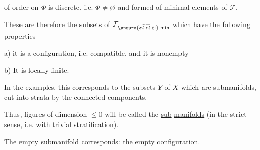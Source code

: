 
of order on $\Phi$ is discrete, i.e. $\Phi\neq\varnothing$ and formed of minimal elements of $\mathcal{F}$.

These are therefore the  subsets of $\mathcal{F}_{\unsure{e\bar l|\overline{el}|\text{él}}\,\mathrm{min}}$ which have the following properties

a) it is a configuration, i.e.    compatible, and it is nonempty

b) It is locally finite.

In the  examples, this corresponds to the  subsets $Y$ of $X$ which are  submanifolds, cut into strata by the connected components.

Thus,  figures of dimension $\leq 0$ will be called the \uline{sub}-\uline{manifolds} (in the strict sense, i.e. with trivial stratification).

The empty submanifold corresponds: the empty configuration.
